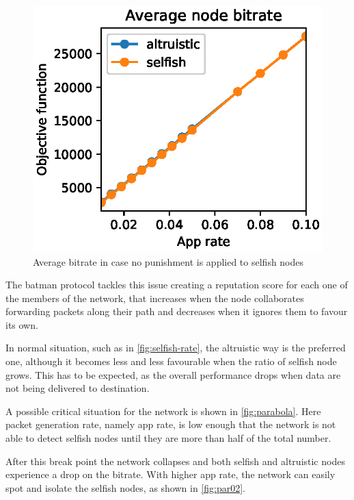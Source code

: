 \documentclass[conference,10.5pt]{IEEEtran}
\begin{document}
\begin{figure}[h]
  \includegraphics{figures/obj_func_vs_app_rate_no_punish.eps}
  \caption{Average bitrate in case no punishment is applied to selfish nodes}
  \label{fig:no-blame-app-rate}
\end{figure}

The \gls{batman} protocol tackles this issue creating a reputation score for each one of the members of the network, that increases when the node collaborates forwarding packets along their path and decreases when it ignores them to favour its own.

In normal situation, such as in \autoref{fig:selfish-rate}, the altruistic way is the preferred one, although it becomes less and less favourable when the ratio of selfish node grows. This has to be expected, as the overall performance drops when data are not being delivered to destination.

A possible critical situation for the network is shown in \autoref{fig:parabola}. Here packet generation rate, namely app rate, is low enough that the network is not able to detect selfish nodes until they are more than half of the total number.

After this break point the network collapses and both selfish and altruistic nodes experience a drop on the bitrate. With higher app rate, the network can easily spot and isolate the selfish nodes, as shown in \autoref{fig:par02}.
\end{document}
